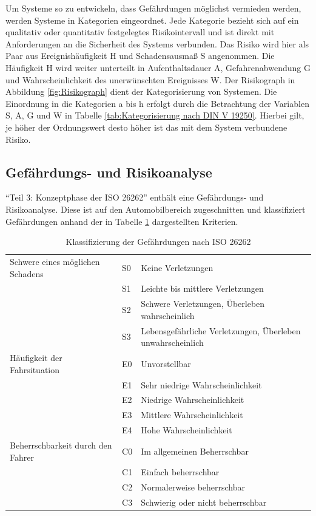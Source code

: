 Um Systeme so zu entwickeln, dass Gefährdungen möglichst vermieden werden, werden Systeme in Kategorien eingeordnet. Jede Kategorie bezieht sich auf ein qualitativ oder quantitativ festgelegtes Risikointervall und ist direkt mit Anforderungen an die Sicherheit des Systems verbunden. Das Risiko wird hier als Paar aus Ereignishäufigkeit H und Schadensausmaß S angenommen. Die Häufigkeit H wird weiter unterteilt in Aufenthaltsdauer A, Gefahrenabwendung G und Wahrscheinlichkeit des unerwünschten Ereignisses W. Der Risikograph in Abbildung \ref{fig:Risikograph} dient der Kategorisierung von Systemen. Die Einordnung in die Kategorien a bis h erfolgt durch die Betrachtung der Variablen S, A, G und W in Tabelle \ref{tab:Kategorisierung nach DIN V 19250}. Hierbei gilt, je höher der Ordnungswert desto höher ist das mit dem System verbundene Risiko.


\subsection{Gefährdungs- und Risikoanalyse}
\enquote{Teil 3: Konzeptphase der ISO 26262} enthält eine Gefährdungs- und Risikoanalyse. Diese ist auf den Automobilbereich zugeschnitten und klassifiziert Gefährdungen anhand der in Tabelle \ref{tab:Kategorisierung nach ISO 26262} dargestellten Kriterien.

\begin{table}[htpb]
	\scriptsize
	\caption[Klassifizierung der Gefährdungen nach ISO 26262]{Klassifizierung der Gefährdungen nach ISO 26262 \parencite[S. 95]{Hillenbrand.2012}}\label{tab:Kategorisierung nach ISO 26262}
	\centering
	\begin{tabular}{l l p{7cm}}
		\toprule
		Schwere eines möglichen Schadens & S0 & Keine Verletzungen\\
		& S1 & Leichte bis mittlere Verletzungen\\
		& S2 & Schwere Verletzungen, Überleben wahrscheinlich\\
		& S3 & Lebensgefährliche Verletzungen, Überleben unwahrscheinlich\\
		\midrule
		Häufigkeit der Fahrsituation & E0 & Unvorstellbar\\
		& E1 & Sehr niedrige Wahrscheinlichkeit\\
		& E2 & Niedrige Wahrscheinlichkeit\\
		& E3 & Mittlere Wahrscheinlichkeit\\
		& E4 & Hohe Wahrscheinlichkeit\\
		\midrule
		Beherrschbarkeit durch den Fahrer & C0 & Im allgemeinen Beherrschbar\\
		& C1 & Einfach beherrschbar\\
		& C2 & Normalerweise beherrschbar\\
		& C3 & Schwierig oder nicht beherrschbar\\
		\bottomrule
	\end{tabular}
\end{table}

